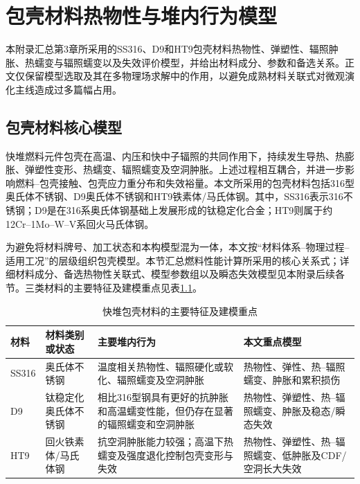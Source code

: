 \chapter{包壳材料热物性与堆内行为模型}
\label{app:cladding_supplementary_models}

本附录汇总第3章所采用的SS316、D9和HT9包壳材料热物性、弹塑性、辐照肿胀、热蠕变与辐照蠕变以及失效评价模型，并给出材料成分、参数和备选关系。正文仅保留模型选取及其在多物理场求解中的作用，以避免成熟材料关联式对微观演化主线造成过多篇幅占用。

\section{包壳材料核心模型}
\label{app:cladding_core_models}

快堆燃料元件包壳在高温、内压和快中子辐照的共同作用下，持续发生导热、热膨胀、弹塑性变形、热蠕变、辐照蠕变及空洞肿胀。上述过程相互耦合，并进一步影响燃料--包壳接触、包壳应力重分布和失效裕量。本文所采用的包壳材料包括316型奥氏体不锈钢、D9奥氏体不锈钢和HT9铁素体/马氏体钢。其中，SS316表示316不锈钢；D9是在316系奥氏体钢基础上发展形成的钛稳定化合金；HT9则属于约12Cr--1Mo--W--V系回火马氏体钢\cite{hofmanMetallicFuelsHandbook2019,halesBISONTheoryManual2016}。

为避免将材料牌号、加工状态和本构模型混为一体，本文按“材料体系--物理过程--适用工况”的层级组织包壳模型。本节汇总燃料性能计算所采用的核心关系式；详细材料成分、备选热物性关联式、模型参数组以及瞬态失效模型见本附录后续各节。三类材料的主要特征及建模重点见表\ref{tab:cladding_material_overview}。

\begin{table}[htbp]
	\centering
	\renewcommand{\arraystretch}{1.18}
	\caption{快堆包壳材料的主要特征及建模重点}
	\label{tab:cladding_material_overview}
	\begin{tabularx}{\textwidth}{p{2.1cm}p{3.0cm}X X}
		\toprule
		{\centering 材料\par} & {\centering 材料类别或状态\par} & {\centering 主要堆内行为\par} & {\centering 本文重点模型\par} \\
		\midrule
		SS316 & 奥氏体不锈钢 & 温度相关热物性、辐照硬化或软化、辐照蠕变及空洞肿胀 & 热物性、弹性、热--辐照蠕变、肿胀和累积损伤 \\
		D9 & 钛稳定化奥氏体不锈钢 & 相比316型钢具有更好的抗肿胀和高温蠕变性能，但仍存在显著的辐照蠕变和空洞肿胀 & 热物性、弹塑性、热--辐照蠕变、肿胀及稳态/瞬态失效 \\
		HT9 & 回火铁素体/马氏体钢 & 抗空洞肿胀能力较强；高温下热蠕变及强度退化控制包壳变形与失效 & 热物性、弹塑性、热--辐照蠕变、低肿胀及CDF/空洞长大失效 \\
		\bottomrule
	\end{tabularx}
\end{table}

